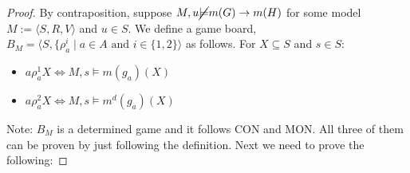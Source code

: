 \documentclass[10pt]{article}
\begin{document}
		\begin{proof}
			By contraposition, suppose $M,u\cancel{\models} m(G) \rightarrow m(H)$ for some model $M:= \langle S,R,V \rangle$ and $u\in S$. We define a game board, $B_M = \langle S, \{\rho_a^i \mid a\in A \text{ and } i\in\{1,2 \}\rangle$ as follows. For $X \subseteq S$ and $s\in S$:
			\begin{itemize}
				\item $a\rho_a^1 X \Longleftrightarrow M,s \models m(g_a)(X)$
				\item $a\rho_a^2 X \Longleftrightarrow M,s \models m^d(g_a)(X)$
			\end{itemize}
			Note: $B_M$ is a determined game and it follows CON and MON. All three of them can be proven by just following the definition. Next we need to prove the following:
			

\end{proof}
\end{document}
